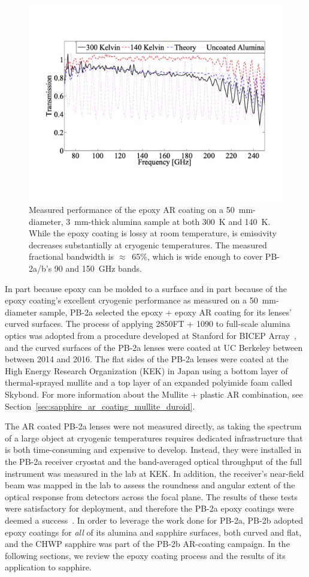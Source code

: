 \begin{figure}[!t]
    \centering
    \includegraphics[width=0.7\linewidth, trim=1.5cm 3.5cm 1cm 3cm, clip]{ARCoating/Figures/epoxy_ar_measured.pdf}
    \caption{Measured performance of the epoxy AR coating on a 50~mm-diameter, 3~mm-thick alumina sample at both 300~K and 140~K. While the epoxy coating is lossy at room temperature, is emissivity decreases substantially at cryogenic temperatures. The measured fractional bandwidth is $\approx$~65\%, which is wide enough to cover PB-2a/b's 90 and 150~GHz bands.}
    \label{fig:measured_epoxy_ar_performance}
\end{figure}

In part because epoxy can be molded to a surface and in part because of the epoxy coating's excellent cryogenic performance as measured on a 50~mm-diameter sample, PB-2a selected the epoxy + epoxy AR coating for its lenses' curved surfaces. The process of applying 2850FT + 1090 to full-scale alumina optics was adopted from a procedure developed at Stanford for BICEP Array~\cite{Hui2018BICEPPolarimeter}, and the curved surfaces of the PB-2a lenses were coated at UC Berkeley between between 2014 and 2016. The flat sides of the PB-2a lenses were coated at the High Energy Research Organization (KEK) in Japan using a bottom layer of thermal-sprayed mullite and a top layer of an expanded polyimide foam called Skybond. For more information about the Mullite + plastic AR combination, see Section~\ref{sec:sapphire_ar_coating_mullite_duroid}. 

The AR coated PB-2a lenses were not measured directly, as taking the spectrum of a large object at cryogenic temperatures requires dedicated infrastructure that is both time-consuming and expensive to develop. Instead, they were installed in the PB-2a receiver cryostat and the band-averaged optical throughput of the full instrument was measured in the lab at KEK. In addition, the receiver's near-field beam was mapped in the lab to assess the roundness and angular extent of the optical response from detectors across the focal plane. The results of these tests were satisfactory for deployment, and therefore the PB-2a epoxy coatings were deemed a success~\cite{Kaneko2020DeploymentPolarbear-2A}. In order to leverage the work done for PB-2a, PB-2b adopted epoxy coatings for \textit{all} of its alumina and sapphire surfaces, both curved and flat, and the CHWP sapphire was part of the PB-2b AR-coating campaign. In the following sections, we review the epoxy coating process and the results of its application to sapphire.

